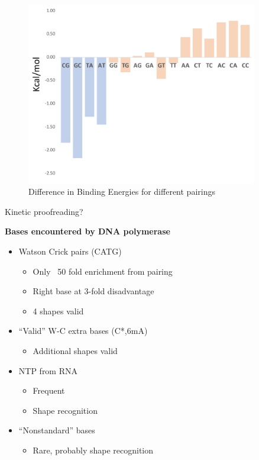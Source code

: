 \documentclass[]{article}
\begin{document}
\begin{figure}[H]
	\caption{Difference in Binding Energies for different pairings} \label{fig:BindingDifference} 
	\includegraphics[width=0.9\textwidth]{BindingDifference}
\end{figure}
 Kinetic proofreading?
 
 
\textbf{Bases encountered by DNA polymerase}
	
\begin{itemize}
	\item Watson Crick pairs (CATG)
	\begin{itemize}
		\item  Only ~50 fold enrichment from pairing
		\item  Right base at 3-fold disadvantage
		\item  4 shapes valid
	\end{itemize}
	\item  “Valid” W-C extra bases (C*,6mA)
	\begin{itemize}
		\item Additional shapes valid
	\end{itemize}
	\item NTP from RNA
	\begin{itemize}
		\item Frequent
		\item Shape recognition
	\end{itemize}
	\item “Nonstandard” bases
	\begin{itemize}
		\item Rare, probably shape recognition
	\end{itemize}
\end{itemize}
\end{document}

